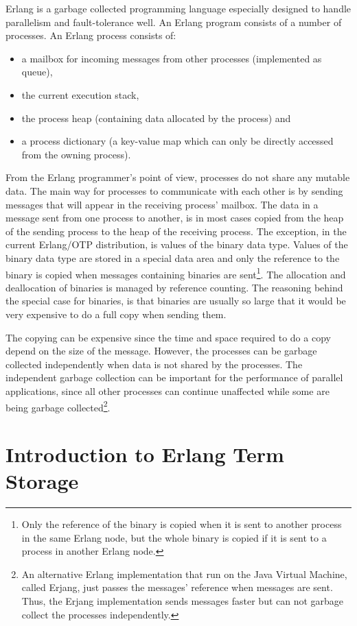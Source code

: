 \documentclass[aps,pre,preprint,nofootinbib]{revtex4}
\begin{document}
Erlang is a garbage collected programming language especially designed to handle parallelism and fault-tolerance well.
An Erlang program consists of a number of processes.
An Erlang process consists of: 
\begin{itemize}
 \item a mailbox for incoming messages from other processes (implemented as queue),
 \item the current execution stack,
 \item the process heap (containing data allocated by the process) and
 \item a process dictionary (a key-value map which can only be directly accessed from the owning process).
\end{itemize}
From the Erlang programmer's point of view, processes do not share any mutable data.
The main way for processes to communicate with each other is by sending messages that will appear in the receiving process' mailbox.
The data in a message sent from one process to another, is in most cases copied from the heap of the sending process to the heap of the receiving process.
The exception, in the current Erlang/OTP distribution, is values of the binary data type.
Values of the binary data type are stored in a special data area and only the reference to the binary is copied when messages containing binaries are sent\footnote{Only the reference of the binary is copied when it is sent to another process in the same Erlang node, but the whole binary is copied if it is sent to a process in another Erlang node.}.
The allocation and deallocation of binaries is managed by reference counting.
The reasoning behind the special case for binaries, is that binaries are usually so large that it would be very expensive to do a full copy when sending them.

The copying can be expensive since the time and space required to do a copy depend on the size of the message.
However, the processes can be garbage collected independently when data is not shared by the processes.
The independent garbage collection can be important for the performance of parallel applications, since all other processes can continue unaffected while some are being garbage collected\footnote{
An alternative Erlang implementation that run on the Java Virtual Machine, called Erjang, just passes the messages' reference when messages are sent.
Thus, the Erjang implementation sends messages faster but can not garbage collect the processes independently.}.

\section{Introduction to Erlang Term Storage}\label{sec:ets_introduction}
\end{document}
